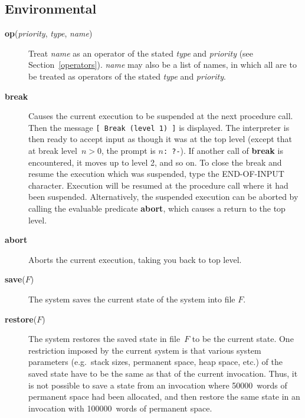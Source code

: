 \subsection{Environmental}
 
\begin{description}
\item[{\bf op}({\em priority}, {\em type}, {\em name})]
    Treat {\em name} as an operator of the stated {\em type} and {\em priority}
    (see Section~\ref{operators}).
    {\em name} may also be a list of names, in which all are to
    be treated as operators of the stated {\em type} and {\em priority}.

\item[{\bf break}] 
    Causes the current execution to be suspended at the next procedure call.
    Then the message {\tt [ Break (level 1) ]} is displayed.
    The interpreter is then ready to accept input as though
    it was at the top level
    (except that at break level~$n > 0$, the prompt is {\tt $n$: ?-}).
    If another call of {\bf break} is encountered, it moves up to level 2,
    and so on.
    To close the break and resume the execution which was suspended, type the
    END-OF-INPUT character.
    Execution will be resumed at the procedure call where it had been suspended.
    Alternatively,
    the suspended execution can be aborted by calling the evaluable
    predicate {\bf abort},
    which causes a return to the top level.

\item[{\bf abort}] 
    Aborts the current execution, taking you back to top level.

\item[{\bf save}($F$)] 
    The system saves the current state of the system into file $F$.

\item[{\bf restore}($F$)] 
    The system restores the saved state in file~$F$ to be the current state.
    One restriction imposed by the current system is that various system
    parameters
    (e.g.\ stack sizes, permanent space, heap space, etc.) of the saved state
    have to be the same as that of the current invocation.
    Thus, it is not possible to save a state from an invocation
    where 50000~words of permanent space had been allocated,
    and then restore the same state in an invocation
    with 100000~words of permanent space.


\end{description}
